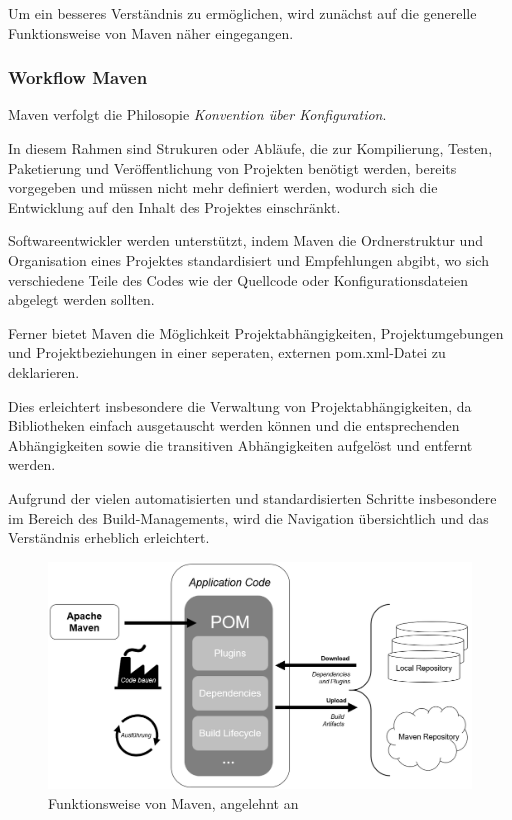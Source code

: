 Um ein besseres Verständnis zu ermöglichen, wird zunächst auf die generelle Funktionsweise von Maven näher eingegangen. 

\subsubsection{Workflow Maven}
Maven verfolgt die Philosopie \textit{Konvention über Konfiguration}. 

In diesem Rahmen sind Strukuren oder Abläufe, die zur Kompilierung, Testen, Paketierung und Veröffentlichung von Projekten benötigt werden, bereits vorgegeben und müssen nicht mehr definiert werden, wodurch sich die Entwicklung auf den Inhalt des Projektes einschränkt. \cite[S. 27]{spiller_maven_2011}

Softwareentwickler werden unterstützt, indem Maven die Ordnerstruktur und Organisation eines Projektes standardisiert und Empfehlungen abgibt, wo sich verschiedene Teile des Codes wie der Quellcode oder Konfigurationsdateien abgelegt werden sollten. \cite[S. 2]{varanasi_introducing_2019}  

Ferner bietet Maven die Möglichkeit Projektabhängigkeiten, Projektumgebungen und Projektbeziehungen in einer seperaten, externen pom.xml-Datei zu deklarieren. \cite[S. 3]{varanasi_introducing_2019} 

Dies erleichtert insbesondere die Verwaltung von Projektabhängigkeiten, da Bibliotheken einfach ausgetauscht werden können und die entsprechenden Abhängigkeiten sowie die transitiven Abhängigkeiten aufgelöst und entfernt werden.

Aufgrund der vielen automatisierten und standardisierten Schritte insbesondere im Bereich des Build-Managements, wird die Navigation übersichtlich und das Verständnis erheblich erleichtert. 

\begin{figure}[h]
    \centering
    \includegraphics[scale=0.6]{Bilder/Workflow_Maven.png}
    \caption{Funktionsweise von Maven, angelehnt an \cite{guntur_understanding_2020}}
\end{figure}

